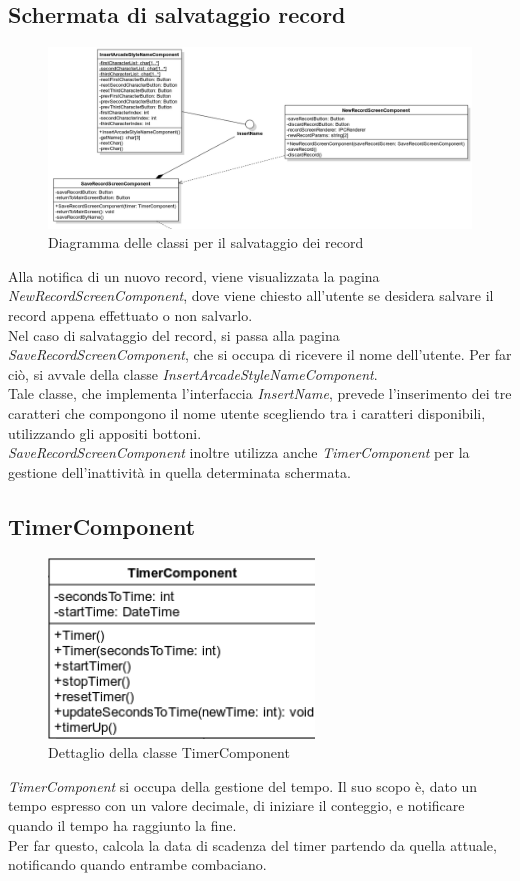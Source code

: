 \subsection{Schermata di salvataggio record}
\begin{figure}[h]
    \centering
    \includegraphics[width=340pt]{ProgettazioneTecnica/NewRecord.png}
    \caption{Diagramma delle classi per il salvataggio dei record}
    \label{fig:attore}
\end{figure}
Alla notifica di un nuovo record, viene visualizzata la pagina \emph{NewRecordScreenComponent}, dove viene chiesto all'utente se desidera salvare il record appena effettuato o non salvarlo.\\
Nel caso di salvataggio del record, si passa alla pagina \emph{SaveRecordScreenComponent}, che si occupa di ricevere il nome dell'utente. Per far ciò, si avvale della classe \emph{InsertArcadeStyleNameComponent}.\\
Tale classe, che implementa l'interfaccia \emph{InsertName}, prevede l'inserimento dei tre caratteri che compongono il nome utente scegliendo tra i caratteri disponibili, utilizzando gli appositi bottoni.\\
\emph{SaveRecordScreenComponent} inoltre utilizza anche \emph{TimerComponent} per la gestione dell'inattività in quella determinata schermata.
\subsection{TimerComponent}
\begin{figure}[h]
    \centering
    \includegraphics[width=200pt]{ProgettazioneTecnica/TimerComponent.png}
    \caption{Dettaglio della classe TimerComponent}
    \label{fig:timer}
\end{figure}
\emph{TimerComponent} si occupa della gestione del tempo. Il suo scopo è, dato un tempo espresso con un valore decimale, di iniziare il conteggio, e notificare quando il tempo ha raggiunto la fine.\\
Per far questo, calcola la data di scadenza del timer partendo da quella attuale, notificando quando entrambe combaciano.
